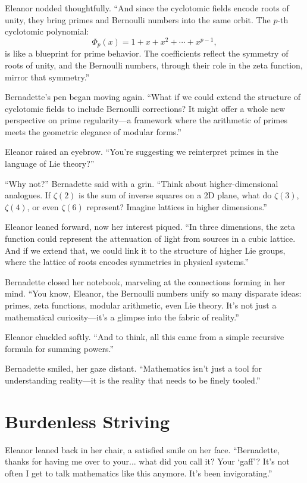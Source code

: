 Eleanor nodded thoughtfully. “And since the cyclotomic fields encode roots of unity, they bring primes and Bernoulli numbers into the same orbit. The \(p\)-th cyclotomic polynomial:
\[
\Phi_p(x) = 1 + x + x^2 + \cdots + x^{p-1},
\]
is like a blueprint for prime behavior. The coefficients reflect the symmetry of roots of unity, and the Bernoulli numbers, through their role in the zeta function, mirror that symmetry.”

Bernadette’s pen began moving again. “What if we could extend the structure of cyclotomic fields to include Bernoulli corrections? It might offer a whole new perspective on prime regularity—a framework where the arithmetic of primes meets the geometric elegance of modular forms.”

Eleanor raised an eyebrow. “You’re suggesting we reinterpret primes in the language of Lie theory?”

“Why not?” Bernadette said with a grin. “Think about higher-dimensional analogues. If \(\zeta(2)\) is the sum of inverse squares on a 2D plane, what do \(\zeta(3)\), \(\zeta(4)\), or even \(\zeta(6)\) represent? Imagine lattices in higher dimensions.”

Eleanor leaned forward, now her interest piqued. “In three dimensions, the zeta function could represent the attenuation of light from sources in a cubic lattice. And if we extend that, we could link it to the structure of higher Lie groups, where the lattice of roots encodes symmetries in physical systems.”

Bernadette closed her notebook, marveling at the connections forming in her mind. “You know, Eleanor, the Bernoulli numbers unify so many disparate ideas: primes, zeta functions, modular arithmetic, even Lie theory. It’s not just a mathematical curiosity—it’s a glimpse into the fabric of reality.”

Eleanor chuckled softly. “And to think, all this came from a simple recursive formula for summing powers.”

Bernadette smiled, her gaze distant. “Mathematics isn’t just a tool for understanding reality—it is the reality that needs to be finely tooled.”

\newpage

\section*{Burdenless Striving}

Eleanor leaned back in her chair, a satisfied smile on her face. “Bernadette, thanks for having me over to your... what did you call it? Your ‘gaff’? It’s not often I get to talk mathematics like this anymore. It’s been invigorating.”

